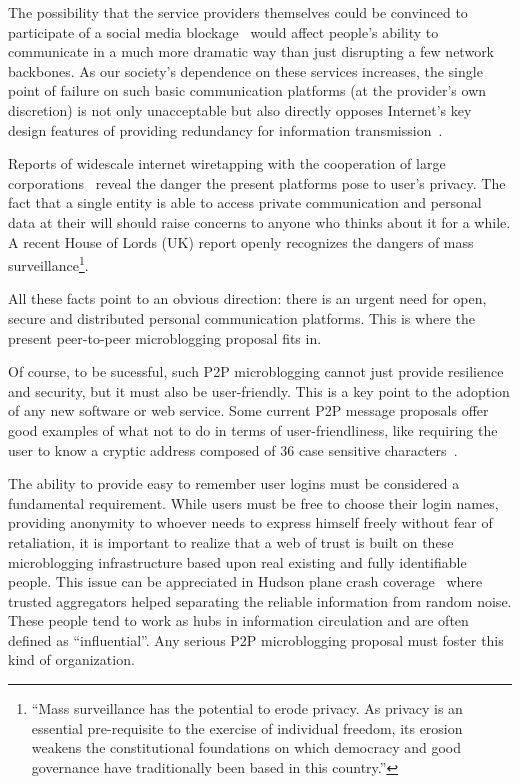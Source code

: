 \documentclass{article}
\begin{document}
The possibility that the service providers themselves could be convinced to participate of a social media blockage~\cite{halliday2011} would affect people's ability to communicate in a much more dramatic way than just disrupting a few network backbones. As our society's dependence on these services increases, the single point of failure on such basic communication platforms (at the provider's own discretion) is not only unacceptable but also directly opposes Internet's key design features of providing redundancy for information transmission~\cite{wikipediainternet}.

Reports of widescale internet wiretapping with the cooperation of large corporations~\cite{greenwald2013} reveal the danger the present platforms pose to user's privacy. The fact that a single entity is able to access private communication and personal data at their will should raise concerns to anyone who thinks about it for a while. A recent House of Lords (UK) report openly recognizes the dangers of mass surveillance\footnote{``Mass surveillance has the potential to erode privacy. As privacy is an essential pre-requisite to the exercise of individual freedom, its erosion weakens the constitutional foundations on which democracy and good governance have traditionally been based in this country.''\cite{surveillance}}.

All these facts point to an obvious direction: there is an urgent need for open, secure and distributed personal communication platforms. This is where the present peer-to-peer microblogging proposal fits in.

Of course, to be sucessful, such P2P microblogging cannot just provide resilience and security, but it must also be user-friendly. This is a key point to the adoption of any new software or web service. Some current P2P message proposals offer good examples of what not to do in terms of user-friendliness, like requiring the user to know a cryptic address composed of 36 case sensitive characters~\cite{warren2012bitmessage}.

The ability to provide easy to remember user logins must be considered a fundamental requirement. While users must be free to choose their login names, providing anonymity to whoever needs to express himself freely without fear of retaliation, it is important to realize that a web of trust is built on these microblogging infrastructure based upon real existing and fully identifiable people. This issue can be appreciated in Hudson plane crash coverage~\cite{sklar2009} where trusted aggregators helped separating the reliable information from random noise. These people tend to work as hubs in information circulation and are often defined as ``influential''. Any serious P2P microblogging proposal must foster this kind of organization.
\end{document}
